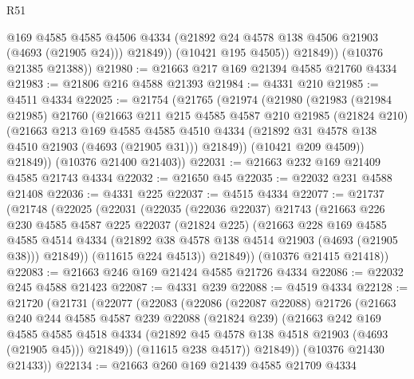 \begin{lexlean}{R51}
\begin{coremodule}
                @169
                @4585
                @4585
                @4506
                @4334
                (@21892 @24 @4578 @138 @4506 @21903 (@4693 (@21905 @24)))
                @21849))
            (@10421 @195 @4505))
          @21849))
      (@10376 @21385 @21388))
@21980 := @21663 @217 @169 @21394 @4585 @21760 @4334
@21983 := @21806 @216 @4588 @21393
@21984 := @4331 @210
@21985 := @4511 @4334
@22025 := @21754
    (@21765
      (@21974
        (@21980
          (@21983
            (@21984 @21985)
            @21760
            (@21663
              @211
              @215
              @4585
              @4587
              @210
              @21985
              (@21824 @210)
              (@21663
                @213
                @169
                @4585
                @4585
                @4510
                @4334
                (@21892 @31 @4578 @138 @4510 @21903 (@4693 (@21905 @31)))
                @21849))
            (@10421 @209 @4509))
          @21849))
      (@10376 @21400 @21403))
@22031 := @21663 @232 @169 @21409 @4585 @21743 @4334
@22032 := @21650 @45
@22035 := @22032 @231 @4588 @21408
@22036 := @4331 @225
@22037 := @4515 @4334
@22077 := @21737
    (@21748
      (@22025
        (@22031
          (@22035
            (@22036 @22037)
            @21743
            (@21663
              @226
              @230
              @4585
              @4587
              @225
              @22037
              (@21824 @225)
              (@21663
                @228
                @169
                @4585
                @4585
                @4514
                @4334
                (@21892 @38 @4578 @138 @4514 @21903 (@4693 (@21905 @38)))
                @21849))
            (@11615 @224 @4513))
          @21849))
      (@10376 @21415 @21418))
@22083 := @21663 @246 @169 @21424 @4585 @21726 @4334
@22086 := @22032 @245 @4588 @21423
@22087 := @4331 @239
@22088 := @4519 @4334
@22128 := @21720
    (@21731
      (@22077
        (@22083
          (@22086
            (@22087 @22088)
            @21726
            (@21663
              @240
              @244
              @4585
              @4587
              @239
              @22088
              (@21824 @239)
              (@21663
                @242
                @169
                @4585
                @4585
                @4518
                @4334
                (@21892 @45 @4578 @138 @4518 @21903 (@4693 (@21905 @45)))
                @21849))
            (@11615 @238 @4517))
          @21849))
      (@10376 @21430 @21433))
@22134 := @21663 @260 @169 @21439 @4585 @21709 @4334

\end{coremodule}
\end{lexlean}
